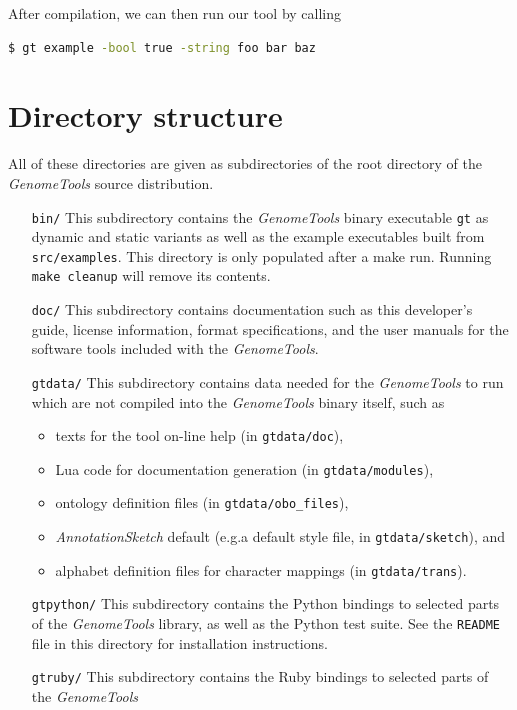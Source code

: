 \documentclass[11pt,final]{article}
\newcommand{\Gt}[0]{\emph{GenomeTools}\xspace}
\begin{document}
After compilation, we can then run our tool by calling

\begin{lstlisting}[language=sh]
$ gt example -bool true -string foo bar baz
\end{lstlisting}%

\section{Directory structure}
All of these directories are given as subdirectories of the root directory of
the \Gt source distribution.
\begin{itemize}
\item[\texttt{bin/}] This subdirectory contains the \Gt binary executable \texttt{gt}
     as dynamic and static variants as well as the example executables built
     from \texttt{src/examples}. This directory is only populated after a
     make run. Running \texttt{make cleanup} will remove its contents.
\item[\texttt{doc/}] This subdirectory contains documentation such as this
     developer's guide, license information, format specifications, and the
     user manuals for the software tools included with the \Gt .
\item[\texttt{gtdata/}]
     This subdirectory contains data needed for the \Gt to run which are not
     compiled into the \Gt binary itself, such as
     \begin{itemize}
       \item texts for the tool on-line help (in \texttt{gtdata/doc}),
       \item Lua code for documentation generation (in \texttt{gtdata/modules}),
       \item ontology definition files (in \texttt{gtdata/obo\_files}),
       \item \emph{AnnotationSketch} default (e.g.\@ a default style file, in
              \texttt{gtdata/sketch}), and
       \item alphabet definition files for character mappings
             (in \texttt{gtdata/trans}).
     \end{itemize}
\item[\texttt{gtpython/}]
     This subdirectory contains the Python bindings to selected parts of the \Gt
     library, as well as the Python test suite. See the \texttt{README} file in
     this directory for installation instructions.
\item[\texttt{gtruby/}]
     This subdirectory contains the Ruby bindings to selected parts of the \Gt

\end{itemize}
\end{document}

